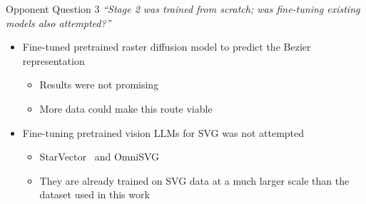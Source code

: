 \documentclass[
  aspectratio=169,
]{beamer}
\newcommand{\tightitems}{\setlength{\itemsep}{0.35em}}
\begin{document}
\begin{frame}{Opponent Question 3}
\textit{``Stage 2 was trained from scratch; was fine-tuning existing models
also attempted?''}

\vspace{.8em}
\begin{itemize}
  \tightitems
  \item Fine-tuned pretrained raster diffusion model to predict the Bezier representation
    \begin{itemize}
      \tightitems
      \item Results were not promising
      \item More data could make this route viable
    \end{itemize}
  \item Fine-tuning pretrained vision LLMs for SVG was not attempted
    \begin{itemize}
      \tightitems
      \item StarVector~\cite{rodriguez2024starvector} and
      OmniSVG~\cite{yang2025omnisvg}
      \item They are already trained on SVG data at a much larger scale than
      the dataset used in this work
    \end{itemize}
\end{itemize}
\end{frame}

\section{\bibname}
\begin{frame}[t, allowframebreaks]{\bibname}
\printbibliography[heading=none]
\end{frame}

\makeoutro
\end{document}
